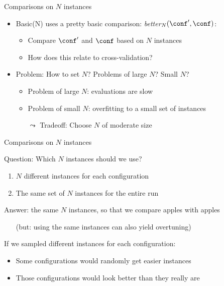 \begin{frame}[c]{Comparisons on $N$ instances}

\begin{itemize}
	\item \alert{Basic(N)} uses a pretty basic comparison: \textit{better$_N(\conf', \conf)$}:
	\begin{itemize}
		\item Compare $\conf'$ and $\conf$ based on $N$ instances 
		\pause
		\item How does this relate to cross-validation? \hands
	\end{itemize}  
	
	\bigskip
	\pause
	\item Problem: How to set $N$? Problems of large $N$? Small $N$? \hands
	\pause
	\begin{itemize}
		\item Problem of large $N$: evaluations are slow
		\item Problem of small $N$: overfitting to a small set of instances
		\item[$\leadsto$] Tradeoff: Choose $N$ of moderate size 
	\end{itemize}
	
\end{itemize}
\end{frame}


\begin{frame}[c]{Comparisons on $N$ instances}


Question: \alert{Which} $N$ instances should we use? \hands
\begin{enumerate}
\item $N$ different instances for each configuration
\item The same set of $N$ instances for the entire run
\end{enumerate}

\bigskip
\pause
Answer: the same $N$ instances, so that we compare apples with apples
\begin{itemize}
\item[] (but: using the same instances can also yield overtuning) 
\end{itemize}
\bigskip


If we sampled different instances for each configuration:
\begin{itemize}
\item Some configurations would randomly get easier instances
\item Those configurations would look better than they really are
\end{itemize}

\end{frame}



